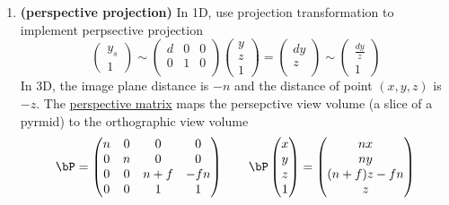 \documentclass[11pt]{article}
\newcommand{\bheading}[1]{\textbf{(#1)}}
\begin{document}
\begin{enumerate}
\begin{enumerate}
    \end{enumerate}
    \item \bheading{perspective projection} In 1D, use projection transformation to implement perpsective projection
    \[
        \begin{pmatrix}
            y_s \\ 1 
        \end{pmatrix}
        \sim
        \begin{pmatrix}
            d & 0 & 0 \\
            0 & 1 & 0 \\
        \end{pmatrix}   
        \begin{pmatrix}
            y \\ z \\ 1
        \end{pmatrix} 
        = 
        \begin{pmatrix}
            dy \\
            z \\
        \end{pmatrix}
        \sim
        \begin{pmatrix}
            \frac{dy}{z} \\
            1
        \end{pmatrix}
    \]
    In 3D, the image plane distance is $-n$ and the distance of point $(x,y,z)$ is $-z$. The \underline{perspective matrix} maps the persepctive view volume (a slice of a pyrmid) to the orthographic view volume
    \[
        \bP = 
        \begin{pmatrix}
            n & 0 & 0 & 0 \\
            0 & n & 0 & 0 \\
            0 & 0 & n+f & -fn \\
            0 & 0 & 1 & 1 \\ 
        \end{pmatrix}
        \quad \quad
        \bP 
        \begin{pmatrix}
            x \\ y \\ z \\ 1
        \end{pmatrix}
        =
        \begin{pmatrix}
            nx \\ ny \\ (n+f)z - fn\\ z
        \end{pmatrix}
\]
\end{enumerate}
\end{document}
